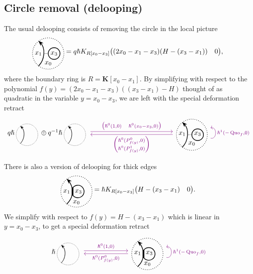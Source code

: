 \documentclass{article}
\DeclareMathOperator{\Quo}{Quo}
\newcommand{\vsdr}[5]{%
	\begin{tikzcd}[column sep=large, ampersand replacement=\&]
		{#1} 
		\arrow[r, "{#3}", shift left=0.5ex, color=violet] 
		\arrow[r, leftarrow, "{#4}", shift right=0.5ex, swap, color=violet] 
		\& #2 \arrow[loop right, distance=1em, in=15, out=-15, "{#5}",swap, color=violet]
	\end{tikzcd}%
}
\newcommand{\kmf}[2]{
	K_{#1}{\begin{pmatrix}
			#2
		\end{pmatrix}
	}	
}
\theoremstyle{plain} %
\theoremstyle{definition} %
\theoremstyle{remark} %
\begin{document}
\subsection{Circle removal (delooping)}
The usual delooping consists of removing the circle in the local picture
\[
	\ThinEdgeAndCircle{x_0}{x_1}{x_3}
	=
	q \hslash \kmf{R[x_0-x_3]}{(2x_0-x_1-x_3)(H-(x_3-x_1)) & 0}
	,
\]
where the boundary ring is $R=\mathbf{K}[x_0-x_1]$. By simplifying with respect to the polynomial $f(y)=(2x_0-x_1-x_3)((x_3-x_1)-H)$ thought of as quadratic in the variable $y=x_0-x_3$, we are left with the special deformation retract
\begin{equation}\label{eq:sdrloop}
	\vsdr{q\hslash \scalebox{0.7}{\SingleEdge{}{}}\oplus q^{-1}\hslash \scalebox{0.7}{\SingleEdge{}{}}}
	{[3cm] \ThinEdgeAndCircle{x_0}{x_1}{x_3}}
	{\begin{pmatrix}
			\hslash^0(1,0) & \hslash^0(x_0-x_3,0)
		\end{pmatrix}}
	{\begin{pmatrix} \hslash^0(P^0_{f(y)},0) \\
			\hslash^0(P^1_{f(y)},0) \end{pmatrix}}
	{\hslash^1(-\Quo_{f},0)}
\end{equation}

There is also a version of delooping for thick edges
\[
\ThickEdgeAndCircle{x_0}{x_1}{x_3}
=
\hslash \kmf{R[x_0-x_3]}{H-(x_3-x_1) & 0}
.
\]
We simplify with respect to $f(y)=H-(x_3-x_1)$ which is linear in $y=x_0-x_3$, to get a special deformation retract
\begin{equation}\label{eq:sdrthickloop}
	\vsdr{\hslash \scalebox{0.7}{\SingleEdge{}{}}}
	{[1cm] \ThickEdgeAndCircle{x_0}{x_1}{x_3}}
	{\hslash^0(1,0)}
	{ \hslash^0(P^0_{f(y)},0)}
	{\hslash^1(-\Quo_{f},0)}
\end{equation}
\end{document}
